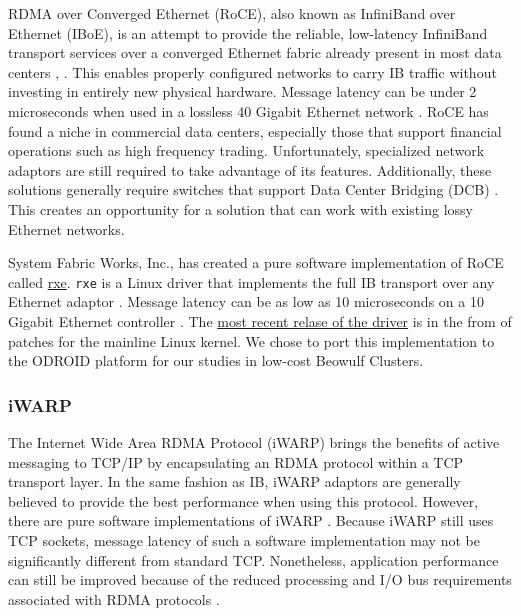 \documentclass[11pt]{book}
\begin{document}
RDMA over Converged Ethernet (RoCE), also known as InfiniBand over Ethernet
(IBoE), is an attempt to provide the reliable, low-latency InfiniBand transport
services over a converged Ethernet fabric already present in most data centers
\cite{InfiniBandTARoCE-10}, \cite{roce-announce}. This enables properly
configured networks to carry IB traffic without investing in entirely new
physical hardware. Message latency can be under 2 microseconds when used in a
lossless 40 Gigabit Ethernet network \cite{vienne-12}. RoCE has found a niche in
commercial data centers, especially those that support financial operations such
as high frequency trading. Unfortunately, specialized network adaptors are still
required to take advantage of its features. Additionally, these solutions
generally require switches that support Data Center Bridging (DCB)
\cite{InfiniBandTARoCE-10}. This creates an opportunity for a solution that can
work with existing lossy Ethernet networks.

System Fabric Works, Inc., has created a pure software implementation of RoCE
called \href{http://www.systemfabricworks.com/downloads/roce}{rxe}. \verb;rxe;
is a Linux driver that implements the full IB transport over any Ethernet
adaptor \cite{pearson-10}. Message latency can be as low as 10
microseconds on a 10 Gigabit Ethernet controller \cite{pearson-10}. The
\href{http://support.systemfabricworks.com/downloads/rxe/}{most recent relase of
  the driver} is in the from of patches for the mainline Linux kernel. We chose
to port this implementation to the ODROID platform for our studies in low-cost
Beowulf Clusters.

\subsubsection{\textbf{iWARP}}

The Internet Wide Area RDMA Protocol (iWARP) brings the benefits of active
messaging to TCP/IP by encapsulating an RDMA protocol within a TCP transport
layer. In the same fashion as IB, iWARP adaptors are generally believed to
provide the best performance when using this protocol. However, there are pure
software implementations of iWARP \cite{neeser-10}. Because iWARP still uses TCP
sockets, message latency of such a software implementation may not be
significantly different from standard TCP. Nonetheless, application performance
can still be improved because of the reduced processing and I/O bus requirements
associated with RDMA protocols \cite{narravula-07}.
\end{document}

